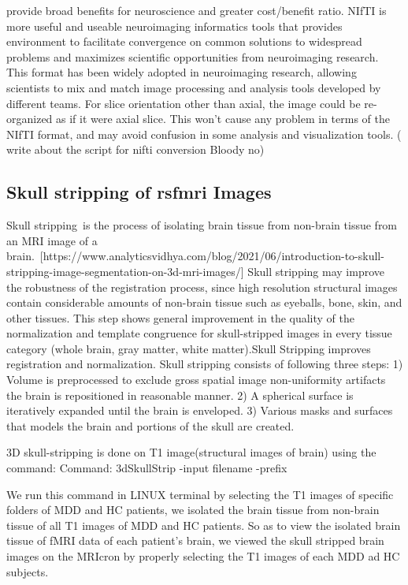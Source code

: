 \documentclass{article}
\begin{document}
provide broad benefits for neuroscience and greater cost/benefit
ratio. NIfTI is more useful and useable neuroimaging informatics tools
that provides environment to facilitate convergence on common
solutions to widespread problems and maximizes scientific
opportunities from neuroimaging research. This format has been widely
adopted in neuroimaging research, allowing scientists to mix and match
image processing and analysis tools developed by different teams. For
slice orientation other than axial, the image could be re-organized as
if it were axial slice. This won’t cause any problem in terms of the
NIfTI format, and may avoid confusion in some analysis and
visualization tools. ( write about the script for nifti conversion
Bloody no)

\subsection{Skull stripping of rsfmri Images}

Skull stripping is the process of isolating brain tissue from
non-brain tissue from an MRI image of a
brain. [https://www.analyticsvidhya.com/blog/2021/06/introduction-to-skull-stripping-image-segmentation-on-3d-mri-images/]
Skull stripping may improve the robustness of the registration
process, since high resolution structural images contain considerable
amounts of non-brain tissue such as eyeballs, bone, skin, and other
tissues. This step shows general improvement in the quality of the
normalization and template congruence for skull-stripped images in
every tissue category (whole brain, gray matter, white matter).Skull
Stripping improves registration and normalization. Skull stripping
consists of following three steps: 1) Volume is preprocessed to
exclude gross spatial image non-uniformity artifacts the brain is
repositioned in reasonable manner. 2) A spherical surface is
iteratively expanded until the brain is enveloped. 3) Various masks
and surfaces that models the brain and portions of the skull are
created.

3D skull-stripping is done on T1 image(structural images of brain)
using the command: Command: 3dSkullStrip -input filename -prefix

We run this command in LINUX terminal by selecting the T1 images of
specific folders of MDD and HC patients, we isolated the brain tissue
from non-brain tissue of all T1 images of MDD and HC patients. So as
to view the isolated brain tissue of fMRI data of each patient's
brain, we viewed the skull stripped brain images on the MRIcron by
properly selecting the T1 images of each MDD ad HC subjects.
\end{document}

